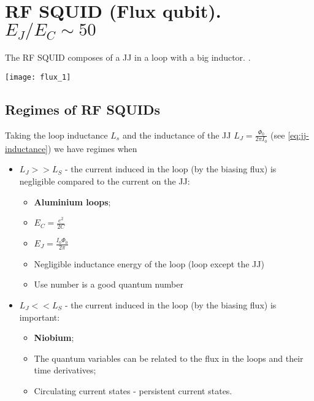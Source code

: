 

\section{RF    SQUID     (Flux    qubit).     $     E_J/E_C\sim    50
  $ \label{sec:rfSquid}}

\begin{framed}\noindent
  \noindent  The RF  SQUID composes  of a  JJ in  a loop  with a  big
  inductor.   .
  \begin{center}
    \texttt{[image: flux\_1]}
  \end{center}
\end{framed}


\subsection{Regimes of RF SQUIDs \cite{orlando1999}}
\label{sec:regimes-rf-squids}

Taking  the  loop inductance  $L_s$  and  the  inductance of  the  JJ
$L_J=\frac{\Phi_{0}}{2\pi  I_0}$ (see  \autoref{eq:jj-inductance}) we
have regimes when

\begin{itemize}
\item $L_J >> L_S$ - the current  induced in the loop (by the biasing
  flux) is negligible compared to the current on the JJ:
  \begin{itemize}
  \item \textbf{Aluminium loops};
  \item $E_C = \frac{e^2}{2C}$
  \item $E_J = \frac{I_0\Phi_0}{2\pi}$
  \item Negligible inductance energy of the loop (loop except the JJ)
  \item Use number is a good quantum number
  \end{itemize}
\item $L_J << L_S$ - the current  induced in the loop (by the biasing
  flux) is important:
  \begin{itemize}
  \item \textbf{Niobium};
  \item The quantum variables can be related to the flux in the loops
    and their time derivatives;
  \item Circulating current states - persistent current states.
  \end{itemize}
\end{itemize}

